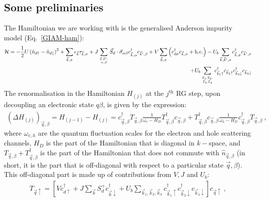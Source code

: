 \documentclass[reprint,superscriptaddress,floatfix]{revtex4-2}
\begin{document}
\begin{widetext}
\subsection{Some preliminaries}
The Hamiltonian we are working with is the generalised Anderson impurity model (Eq.~\ref{GIAM-ham}):
\begin{equation}\begin{aligned}
	\mathcal{H} = -\frac{1}{2}U \left(\hat n_{d \uparrow} - \hat n_{d \downarrow}\right)^2 + \sum_{\vec k,\sigma} \epsilon_{\vec k} \tau_{\vec k,\sigma} + J \sum_{\vec k,\vec k^\prime,\atop{\alpha,\beta}}\vec{S}_d\cdot\vec{\sigma}_{\alpha\beta}c^\dagger_{\vec k,\alpha}c_{\vec k^\prime,\beta} + V\sum_{\vec k,\sigma} \left( c^\dagger_{d\sigma}c_{\vec k,\sigma} + \text{h.c.}\right) - U_b \sum_{\vec k,\vec k^\prime,\sigma}c^\dagger_{\vec k,\sigma}c_{\vec k^\prime,\sigma} \\
+ U_b \sum_{\vec k_1,\vec k_2,\atop{\vec k_3,\vec k_4}}c^\dagger_{\vec k_1 \uparrow} c_{\vec k_2 \uparrow} c^\dagger_{\vec k_3 \downarrow} c_{\vec k_4 \downarrow}
\end{aligned}\end{equation}
The renormalisation in the Hamiltonian \(H_{(j)}\) at the \(j^\text{th}\) RG step, upon decoupling an electronic state \(q\beta\), is given by the expression:
\begin{equation}\begin{aligned}
	\left(\Delta H_{(j)}\right)_{\vec q,\beta} = H_{(j-1)} - H_{(j)} = c^\dagger_{\vec q,\beta} T_{\vec q,\beta} \frac{1}{\omega_e - H_D} T^\dagger_{\vec q,\beta}c_{\vec q,\beta} + T^\dagger_{\vec q,\beta} c_{\vec q,\beta} \frac{1}{\omega_h - H_D} c^\dagger_{\vec q,\beta}T_{\vec q,\beta}~,
\end{aligned}\end{equation}
where \(\omega_{e,h}\) are the quantum fluctuation scales for the electron and hole scattering channels, \(H_D\) is the part of the Hamiltonian that is diagonal in \(k-\)space, and \(T_{\vec q,\beta} + T_{\vec q,\beta}^\dagger\) is the part of the Hamiltonian that does not commute with \(\hat n_{\vec q,\beta}\) (in short, it is the part that is off-diagonal with respect to a particular state \(\vec q,\beta\)). This off-diagonal part is made up of contributions from \(V,J\) and \(U_b\):
\begin{equation}\begin{aligned}
	T_{\vec q \uparrow} = \left[V c^\dagger_{d \uparrow}  + J \sum_{\vec k}S_d^+ c^\dagger_{\vec k \downarrow}  + U_b \sum_{\vec k_1,\vec k_2,\vec k_3}c^\dagger_{\vec k_1 \uparrow} c^\dagger_{\vec k_3 \downarrow} c_{\vec k_4 \downarrow}\right] c_{\vec q \uparrow} ~,

\end{aligned}
\end{equation}
\end{widetext}
\end{document}
